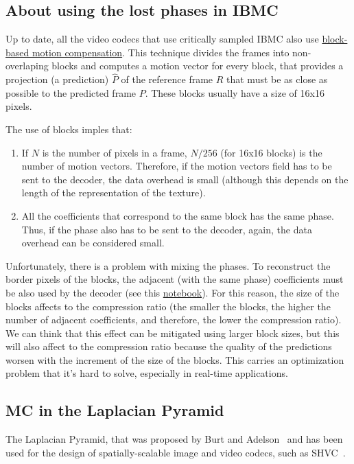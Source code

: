 \subsection{About using the lost phases in IBMC}
Up to date, all the video codecs that use critically sampled IBMC also
use
\href{https://vicente-gonzalez-ruiz.github.io/video_compression/}{block-based
  motion compensation}. This technique divides the frames into
non-overlaping blocks and computes a motion vector for every block,
that provides a projection (a prediction) $\hat{P}$ of the reference
frame $R$ that must be as close as possible to the predicted frame
$P$. These blocks usually have a size of 16x16 pixels.

The use of blocks imples that:
\begin{enumerate}
\item If $N$ is the number of pixels in a frame, $N/256$ (for 16x16
  blocks) is the number of motion vectors. Therefore, if the motion
  vectors field has to be sent to the decoder, the data overhead is
  small (although this depends on the length of the representation of
  the texture).
\item All the coefficients that correspond to the same block has the
  same phase. Thus, if the phase also has to be sent to the decoder,
  again, the data overhead can be considered small.
\end{enumerate}

Unfortunately, there is a problem with mixing the phases. To
reconstruct the border pixels of the blocks, the adjacent (with the
same phase) coefficients must be also used by the decoder (see this
\href{https://github.com/Sistemas-Multimedia/Sistemas-Multimedia.github.io/blob/master/milestones/11-MC_in_DWT_domain/mixing_phases.ipynb}{notebook}). For
this reason, the size of the blocks affects to the compression ratio
(the smaller the blocks, the higher the number of adjacent
coefficients, and therefore, the lower the compression ratio). We can
think that this effect can be mitigated using larger block sizes, but
this will also affect to the compression ratio because the quality of
the predictions worsen with the increment of the size of the
blocks. This carries an optimization problem that it's hard to solve,
especially in real-time applications.

\subsection{MC in the Laplacian Pyramid}
The Laplacian Pyramid, that was proposed by Burt and
Adelson~\cite{burt1987laplacian} and has been used for the design of
spatially-scalable image and video codecs, such as
SHVC~\cite{sullivan2012overview}.


